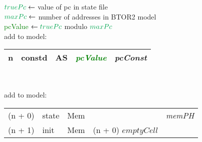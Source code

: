 \begin{algorithm}
    $\textcolor{Green}{truePc} \leftarrow$ value of pc in state file\\
    $\textcolor{Green}{maxPc} \leftarrow$ number of addresses in BTOR2 model\\
    \textcolor{Green}{pcValue} $\leftarrow \textcolor{Green}{truePc}$ modulo $\textcolor{Green}{maxPc}$\\
    add to model:\\
    \begin{tabular}[h]{>{\color{UniRed}}r l >{\color{UniGrey}}l l >{\slshape} l}
        \hline
        \hline
        \ttfamily
        n & constd & AS & \textcolor{Green}{\rmfamily\textsl{pcValue}} & pcConst \\
        \hline
        \hline
    \end{tabular}\\
    \BlankLine

    \BlankLine
    add to model:\\

    \begin{tabular}[h]{>{\ttfamily\color{UniRed}}r >{\ttfamily}l >{\ttfamily\color{UniGrey}}l >{\ttfamily}l >{\slshape} l}
        \hline
        \hline
        (n + 0) & state & Mem &                                         & memPH \\
        (n + 1) & init  & Mem & \textcolor{UniRed}{(n + 0) $emptyCell$} &       \\
        \hline
        \hline
    \end{tabular}\\


\end{algorithm}
